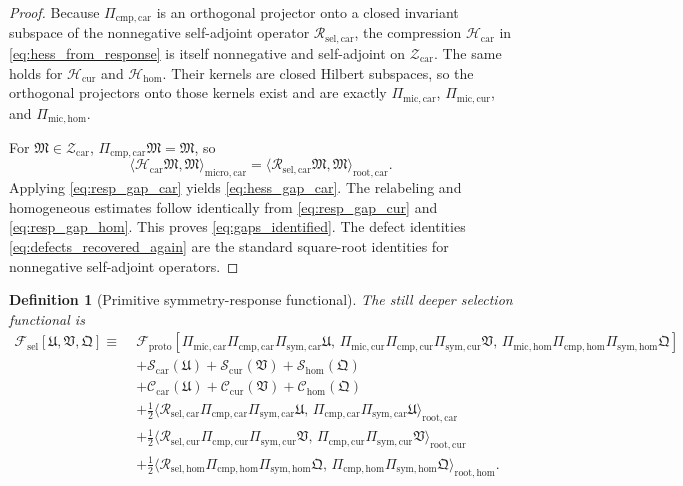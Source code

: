 \documentclass[11pt]{article}
\newcommand{\ProtoFunctional}{\mathscr F_{\mathrm{proto}}}
\newcommand{\StemFunctional}{\mathscr F_{\mathrm{sel}}}
\newcommand{\UltraTensorClass}{\mathscr Z_{\mathrm{car}}}
\newcommand{\UltraTensor}{\mathfrak M}
\newcommand{\UltraCarProj}{\Pi_{\mathrm{mic,car}}}
\newcommand{\UltraCurProj}{\Pi_{\mathrm{mic,cur}}}
\newcommand{\UltraHomProj}{\Pi_{\mathrm{mic,hom}}}
\newcommand{\RootTensor}{\mathfrak U}
\newcommand{\RootRelabel}{\mathfrak V}
\newcommand{\RootFree}{\mathfrak Q}
\newcommand{\TensorSymProj}{\Pi_{\mathrm{sym,car}}}
\newcommand{\CurSymProj}{\Pi_{\mathrm{sym,cur}}}
\newcommand{\HomSymProj}{\Pi_{\mathrm{sym,hom}}}
\newcommand{\TensorHess}{\mathcal H_{\mathrm{car}}}
\newcommand{\CurHess}{\mathcal H_{\mathrm{cur}}}
\newcommand{\HomHess}{\mathcal H_{\mathrm{hom}}}
\newcommand{\TensorCmpProj}{\Pi_{\mathrm{cmp,car}}}
\newcommand{\CurCmpProj}{\Pi_{\mathrm{cmp,cur}}}
\newcommand{\HomCmpProj}{\Pi_{\mathrm{cmp,hom}}}
\newcommand{\TensorResp}{\mathcal R_{\mathrm{sel,car}}}
\newcommand{\CurResp}{\mathcal R_{\mathrm{sel,cur}}}
\newcommand{\HomResp}{\mathcal R_{\mathrm{sel,hom}}}
\newtheorem{definition}{Definition}
\begin{document}
\begin{proof}
Because \(\TensorCmpProj\) is an orthogonal projector onto a closed invariant subspace of the nonnegative self-adjoint operator \(\TensorResp\), the compression \(\TensorHess\) in \eqref{eq:hess_from_response} is itself nonnegative and self-adjoint on \(\UltraTensorClass\). The same holds for \(\CurHess\) and \(\HomHess\). Their kernels are closed Hilbert subspaces, so the orthogonal projectors onto those kernels exist and are exactly \(\UltraCarProj\), \(\UltraCurProj\), and \(\UltraHomProj\).

For \(\UltraTensor\in\UltraTensorClass\), \(\TensorCmpProj\UltraTensor=\UltraTensor\), so
\[
\langle \TensorHess\UltraTensor,\UltraTensor\rangle_{\mathrm{micro,car}}
=
\langle \TensorResp\UltraTensor,\UltraTensor\rangle_{\mathrm{root,car}}.
\]
Applying \eqref{eq:resp_gap_car} yields \eqref{eq:hess_gap_car}. The relabeling and homogeneous estimates follow identically from \eqref{eq:resp_gap_cur} and \eqref{eq:resp_gap_hom}. This proves \eqref{eq:gaps_identified}. The defect identities \eqref{eq:defects_recovered_again} are the standard square-root identities for nonnegative self-adjoint operators.
\end{proof}

\begin{definition}[Primitive symmetry-response functional]
\label{def:Fstem}
The still deeper selection functional is
\begin{equation}
\begin{aligned}
\StemFunctional[\RootTensor,\RootRelabel,\RootFree]
\equiv\;
&\ProtoFunctional[
\UltraCarProj\TensorCmpProj\TensorSymProj\RootTensor,\,
\UltraCurProj\CurCmpProj\CurSymProj\RootRelabel,\,
\UltraHomProj\HomCmpProj\HomSymProj\RootFree]
\\
&+\mathcal S_{\mathrm{car}}(\RootTensor)
+\mathcal S_{\mathrm{cur}}(\RootRelabel)
+\mathcal S_{\mathrm{hom}}(\RootFree)
\\
&+\mathcal C_{\mathrm{car}}(\RootTensor)
+\mathcal C_{\mathrm{cur}}(\RootRelabel)
+\mathcal C_{\mathrm{hom}}(\RootFree)
\\
&+\frac12
\langle \TensorResp\TensorCmpProj\TensorSymProj\RootTensor,\,
\TensorCmpProj\TensorSymProj\RootTensor\rangle_{\mathrm{root,car}}
\\
&+\frac12
\langle \CurResp\CurCmpProj\CurSymProj\RootRelabel,\,
\CurCmpProj\CurSymProj\RootRelabel\rangle_{\mathrm{root,cur}}
\\
&+\frac12
\langle \HomResp\HomCmpProj\HomSymProj\RootFree,\,
\HomCmpProj\HomSymProj\RootFree\rangle_{\mathrm{root,hom}}.
\end{aligned}
\label{eq:Fstem}
\end{equation}
\end{definition}
\end{document}
